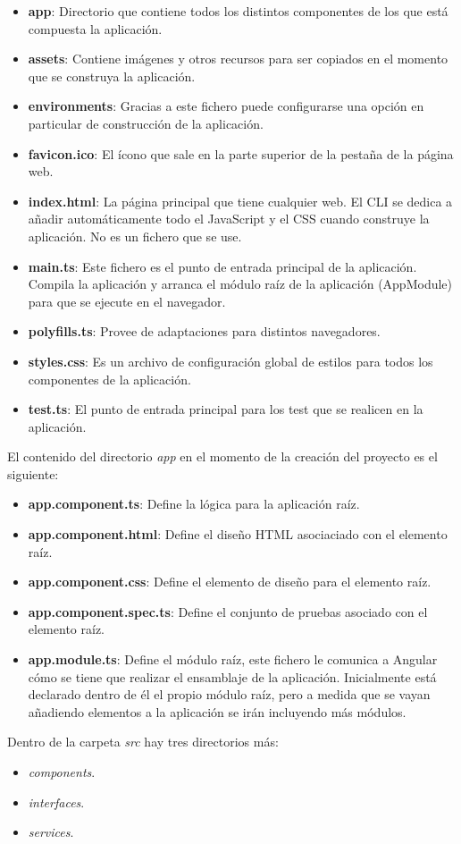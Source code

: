 \begin{itemize}
    \item \textbf{app}: Directorio que contiene todos los distintos componentes de los que está compuesta la aplicación.
    \item \textbf{assets}: Contiene imágenes y otros recursos para ser copiados en el momento que se construya la aplicación.
    \item \textbf{environments}: Gracias a este fichero puede configurarse una opción en particular de construcción de la aplicación.
    \item \textbf{favicon.ico}: El ícono que sale en la parte superior de la pestaña de la página web.
    \item \textbf{index.html}: La página principal que tiene cualquier web. El CLI se dedica a añadir automáticamente todo el JavaScript y el CSS cuando construye la aplicación. No es un fichero que se use.
    \item \textbf{main.ts}: Este fichero es el punto de entrada principal de la aplicación. Compila la aplicación y arranca el módulo raíz de la aplicación (AppModule) para que se ejecute en el navegador.
    \item \textbf{polyfills.ts}: Provee de adaptaciones para distintos navegadores.
    \item \textbf{styles.css}: Es un archivo de configuración global de estilos para todos los componentes de la aplicación.
    \item \textbf{test.ts}: El punto de entrada principal para los test que se realicen en la aplicación.
\end{itemize}

El contenido del directorio \textit{app} en el momento de la creación del proyecto es el siguiente:

\begin{itemize}
    \item \textbf{app.component.ts}: Define la lógica para la aplicación raíz.
    \item \textbf{app.component.html}: Define el diseño HTML asociaciado con el elemento raíz.
    \item \textbf{app.component.css}: Define el elemento de diseño para el elemento raíz.
    \item \textbf{app.component.spec.ts}: Define el conjunto de pruebas asociado con el elemento raíz.
    \item \textbf{app.module.ts}: Define el módulo raíz, este fichero le comunica a Angular cómo se tiene que realizar el ensamblaje de la aplicación. Inicialmente está declarado dentro de él el propio módulo raíz, pero a medida que se vayan añadiendo elementos a la aplicación se irán incluyendo más módulos.
\end{itemize}

Dentro de la carpeta \textit{src} hay tres directorios más:
\begin{itemize}
    \item \textit{components}.
    \item \textit{interfaces}.
    \item \textit{services}.
\end{itemize}